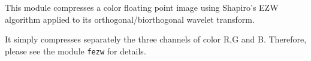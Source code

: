 This module compresses a color floating point image using 
Shapiro's EZW algorithm applied to its orthogonal/biorthogonal wavelet 
transform. 

It simply compresses separately the three channels of color R,G and B.
Therefore, please see the module \verb+fezw+ for details.

